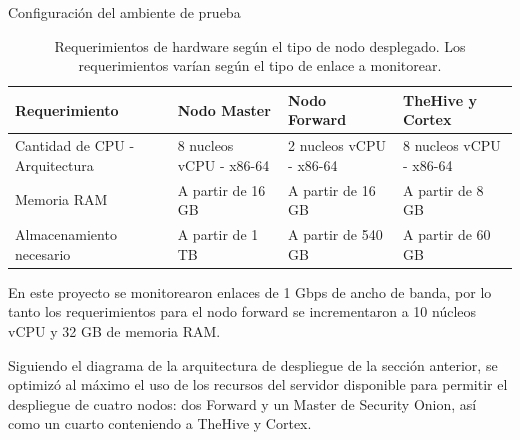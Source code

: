 \begin{section}{Configuración del ambiente de prueba}
\begin{table}[H]
\begin{tabular}{|m{9em}|m{9em}|m{9em}|m{9em}|}
            \hline 
                Requerimiento  & Nodo Master &  Nodo Forward & TheHive y Cortex \\ 
            \hline
                Cantidad de CPU - Arquitectura & 8 nucleos vCPU - x86-64 & 2 nucleos vCPU - x86-64 & 8 nucleos vCPU - x86-64 \\ 
            \hline
                Memoria RAM  & A partir de 16 GB & A partir de 16 GB & A partir de 8 GB \\ 
            \hline
                Almacenamiento necesario & A partir de 1 TB  & A partir de 540 GB & A partir de 60 GB \\
            \hline %
        \end{tabular}
        \caption{Requerimientos de hardware según el tipo de nodo desplegado. Los requerimientos varían según el tipo de enlace a monitorear.}
        \label{table:5}
    \end{table}
     \FloatBarrier
        En este proyecto se monitorearon enlaces de 1 Gbps de ancho de banda, por lo tanto los requerimientos para el nodo forward se incrementaron a 10 núcleos vCPU y 32 GB de memoria RAM. \par
    	Siguiendo el diagrama de la arquitectura de despliegue de la sección anterior, se optimizó al máximo el uso de los recursos del servidor disponible para permitir el despliegue de cuatro nodos: dos Forward y un Master de Security Onion, así como un cuarto conteniendo a TheHive y Cortex. \par


\end{section}
